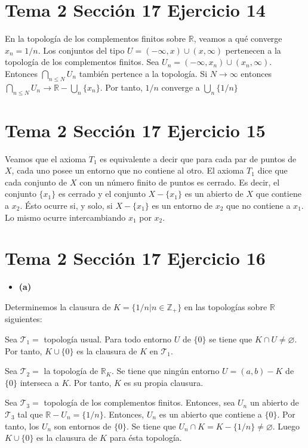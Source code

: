 \documentclass{article}
\begin{document}
\section{Tema 2 Sección 17 Ejercicio 14}
En la topología de los complementos finitos sobre $\mathbb{R}$, veamos a qué converge $x_n=1/n$. Los conjuntos del tipo $U=(-\infty, x)\cup (x,\infty)$ pertenecen a la topología de los complementos finitos. Sea $U_n=(-\infty, x_n)\cup (x_n,\infty)$. Entonces $\bigcap_{n\leq N}U_n$ también pertence a la topología. Si $N \rightarrow \infty$ entonces $\bigcap_{n\leq N}U_n\rightarrow \mathbb{R}-\bigcup_{n}\{x_n\}$. Por tanto, $1/n$ converge a $\bigcup_{n}\{1/n\}$
\section{Tema 2 Sección 17 Ejercicio 15}
Veamos que el axioma $T_1$ es equivalente a decir que para cada par de puntos de $X$, cada uno posee un entorno que no contiene al otro. El axioma $T_1$ dice que cada conjunto de $X$ con un número finito de puntos es cerrado. Es decir, el  conjunto $\{x_1\}$
es cerrado y el conjunto $X-\{x_1\}$ es un abierto de $X$ que contiene a $x_2$. Ésto ocurre si, y solo, si $X-\{x_1\}$ es un entorno de $x_2$ que no contiene a $x_1$. Lo mismo ocurre intercambiando $x_1$ por $x_2$.
\section{Tema 2 Sección 17 Ejercicio 16}
\begin{itemize}
\item \bf (a) \rm 
\end{itemize} Determinemos la clausura de $K=\{1/n|n\in \mathbb{Z}_+\}$ en las topologías sobre $\mathbb{R}$ siguientes:

Sea $\mathcal{T}_1=$ topología usual. Para todo entorno $U$ de $\{0\}$ se tiene que $K\cap U\neq \varnothing$. Por tanto, $K\cup\{0\}$ es la clausura de $K$ en $\mathcal{T}_1$.

Sea $\mathcal{T}_2=$ la topología de $\mathbb{R}_K$. Se tiene que ningún entorno $U=(a,b)-K$ de $\{0\}$ interseca a $K$. Por tanto, $K$ es su propia clausura.

Sea $\mathcal{T}_3=$ topología de los complementos finitos. Entonces, sea $U_n$ un abierto de $\mathcal{T}_3$ tal que $\mathbb{R}-U_n=\{1/n\}$. Entonces, $U_n$ es un abierto que contiene a $\{0\}$. Por tanto, los $U_n$ son entornos de $\{0\}$. Se tiene que $U_n\cap K= K-\{1/n\}\neq \varnothing$. Luego $K\cup \{0\}$ es la clausura de $K$ para ésta topología.
\end{document}
